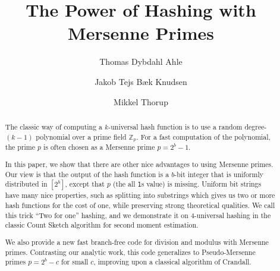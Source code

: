 \documentclass[11pt, a4paper]{article}
\title{The Power of Hashing with Mersenne Primes}
\author[1]{Thomas Dybdahl Ahle}
\author[2]{Jakob Tejs B\ae{}k Knudsen}
\author[2]{Mikkel Thorup}
\affil[1]{IT University of Copenhagen, BARC}
\affil[2]{University of Copenhagen, BARC}
\begin{document}
\maketitle

\begin{abstract}
The classic way of computing a $k$-universal hash function is to use a random degree-$(k-1)$ polynomial over a prime field $\mathbb Z_p$.
For a fast computation of the polynomial, the prime $p$ is often chosen as a Mersenne prime $p=2^b-1$.

In this paper, we show that there are other nice advantages to using Mersenne primes.
Our view is that the output of the hash function is a $b$-bit integer that is uniformly distributed in $[2^b]$, except that $p$ (the all \texttt1s value) is missing.
Uniform bit strings have many nice properties, such as splitting into substrings which gives us two or more hash functions for the cost of one, while preserving strong theoretical qualities.
We call this trick ``Two for one'' hashing, and we demonstrate it on 4-universal hashing in the classic Count Sketch algorithm for second moment estimation.

We also provide a new fast branch-free code for division and modulus
with Mersenne primes. Contrasting our analytic work, this code
generalizes to Pseudo-Mersenne primes $p=2^b-c$ for small $c$,
improving upon a classical algorithm of Crandall.
\end{abstract}

\setcounter{tocdepth}{2}
\renewcommand{\contentsname}{}
\vspace{-3.5em}
\tableofcontents
\newpage







% 







\end{document}
